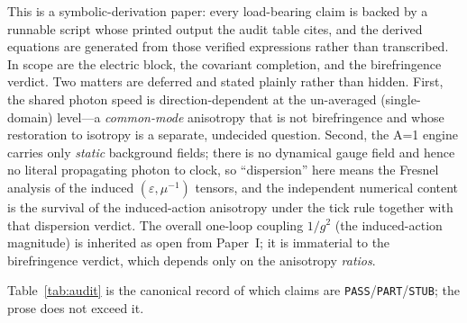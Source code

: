 This is a symbolic-derivation paper: every load-bearing claim is backed by a
runnable script whose printed output the audit table cites, and the derived
equations are generated from those verified expressions rather than transcribed.
In scope are the electric block, the covariant completion, and the birefringence
verdict. Two matters are deferred and stated plainly rather than hidden. First,
the shared photon speed is direction-dependent at the un-averaged (single-domain)
level---a \emph{common-mode} anisotropy that is not birefringence and whose
restoration to isotropy is a separate, undecided question. Second, the A=1 engine
carries only \emph{static} background fields; there is no dynamical gauge field and
hence no literal propagating photon to clock, so ``dispersion'' here means the
Fresnel analysis of the induced $(\varepsilon,\mu^{-1})$ tensors, and the
independent numerical content is the survival of the induced-action anisotropy
under the tick rule together with that dispersion verdict. The overall
one-loop coupling $1/g^2$ (the induced-action magnitude) is inherited as open from
Paper~I; it is immaterial to the birefringence verdict, which depends only on the
anisotropy \emph{ratios}.

Table~\ref{tab:audit} is the canonical record of which claims are
\texttt{PASS}/\texttt{PART}/\texttt{STUB}; the prose does not exceed it.


